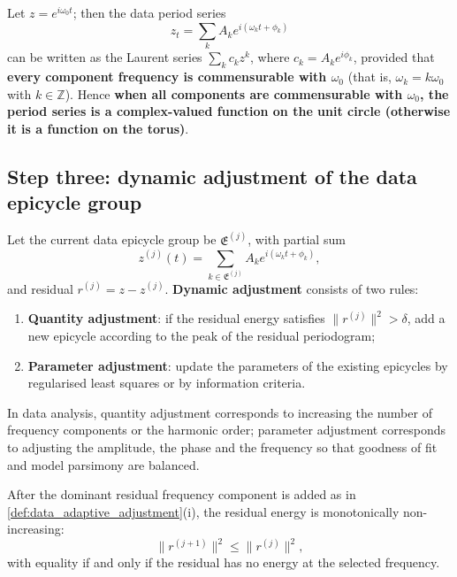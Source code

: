 \begin{remark}\label{rem:data_series_complex}
Let $z=e^{i\omega_0t}$; then the data period series
\[
z_t=\sum_k A_k e^{i(\omega_k t+\phi_k)}
\]
can be written as the Laurent series $\sum_k c_k z^k$, where $c_k=A_k e^{i\phi_k}$, provided that \textbf{every component frequency is commensurable with $\omega_0$} (that is, $\omega_k=k\omega_0$ with $k\in\mathbb Z$). Hence \textbf{when all components are commensurable with $\omega_0$, the period series is a complex-valued function on the unit circle (otherwise it is a function on the torus)}.
\end{remark}

\subsection{Step three: dynamic adjustment of the data epicycle group}

\begin{definition}\label{def:data_adaptive_adjustment}
Let the current data epicycle group be $\mathfrak E^{(j)}$, with partial sum
\[
z^{(j)}(t)=\sum_{k\in\mathfrak E^{(j)}}A_k e^{i(\omega_k t+\phi_k)},
\]
and residual $r^{(j)}=z-z^{(j)}$. \textbf{Dynamic adjustment} consists of two rules:
\begin{enumerate}[label=(\roman*)]
    \item \textbf{Quantity adjustment}: if the residual energy satisfies $\|r^{(j)}\|^2>\delta$, add a new epicycle according to the peak of the residual periodogram;
    \item \textbf{Parameter adjustment}: update the parameters of the existing epicycles by regularised least squares or by information criteria.
\end{enumerate}
In data analysis, quantity adjustment corresponds to increasing the number of frequency components or the harmonic order; parameter adjustment corresponds to adjusting the amplitude, the phase and the frequency so that goodness of fit and model parsimony are balanced.
\end{definition}

\begin{proposition}\label{prop:data_adaptive_growth}
After the dominant residual frequency component is added as in \cref{def:data_adaptive_adjustment}(i), the residual energy is monotonically non-increasing:
\[
\|r^{(j+1)}\|^2\le\|r^{(j)}\|^2,
\]
with equality if and only if the residual has no energy at the selected frequency.
\end{proposition}


